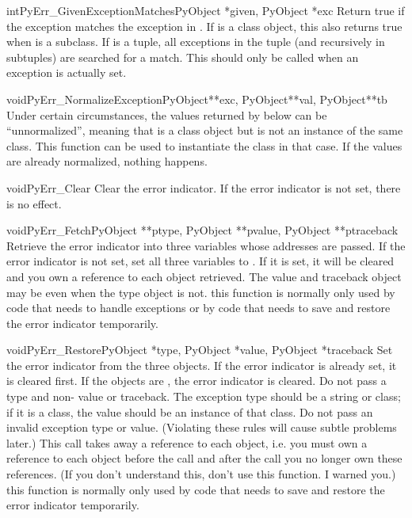 \documentclass[twoside,openright]{report}
\begin{document}
\begin{cfuncdesc}{int}{PyErr_GivenExceptionMatches}{PyObject *given, PyObject *exc}
Return true if the  exception matches the exception in
.  If  is a class object, this also returns true
when  is a subclass.  If  is a tuple, all
exceptions in the tuple (and recursively in subtuples) are searched
for a match.  This should only be called when an exception is actually
set.
\end{cfuncdesc}

\begin{cfuncdesc}{void}{PyErr_NormalizeException}{PyObject**exc, PyObject**val, PyObject**tb}
Under certain circumstances, the values returned by
 below can be ``unnormalized'', meaning that
 is a class object but  is not an instance of the
same class.  This function can be used to instantiate the class in
that case.  If the values are already normalized, nothing happens.
\end{cfuncdesc}

\begin{cfuncdesc}{void}{PyErr_Clear}{}
Clear the error indicator.  If the error indicator is not set, there
is no effect.
\end{cfuncdesc}

\begin{cfuncdesc}{void}{PyErr_Fetch}{PyObject **ptype, PyObject **pvalue, PyObject **ptraceback}
Retrieve the error indicator into three variables whose addresses are
passed.  If the error indicator is not set, set all three variables to
\NULL{}.  If it is set, it will be cleared and you own a reference to
each object retrieved.  The value and traceback object may be \NULL{}
even when the type object is not.   this function is
normally only used by code that needs to handle exceptions or by code
that needs to save and restore the error indicator temporarily.
\end{cfuncdesc}

\begin{cfuncdesc}{void}{PyErr_Restore}{PyObject *type, PyObject *value, PyObject *traceback}
Set  the error indicator from the three objects.  If the error
indicator is already set, it is cleared first.  If the objects are
\NULL{}, the error indicator is cleared.  Do not pass a \NULL{} type
and non-\NULL{} value or traceback.  The exception type should be a
string or class; if it is a class, the value should be an instance of
that class.  Do not pass an invalid exception type or value.
(Violating these rules will cause subtle problems later.)  This call
takes away a reference to each object, i.e. you must own a reference
to each object before the call and after the call you no longer own
these references.  (If you don't understand this, don't use this
function.  I warned you.)   this function is normally
only used by code that needs to save and restore the error indicator
temporarily.
\end{cfuncdesc}
\end{document}
